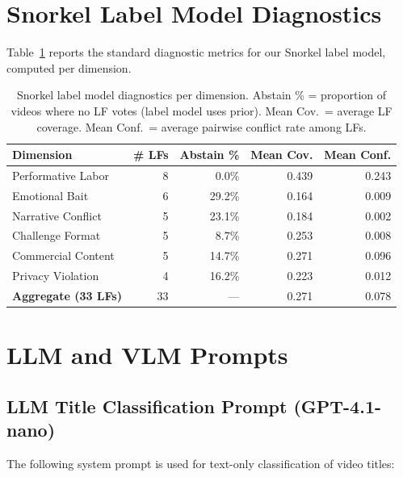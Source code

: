 \documentclass[letterpaper]{article} %
\begin{document}
\section{Snorkel Label Model Diagnostics}
\label{app:diagnostics}

Table~\ref{tab:diagnostics} reports the standard diagnostic metrics for our Snorkel label model, computed per dimension.

\begin{table}[h!]
\centering
\small
\begin{tabular}{lrrrr}
\toprule
\textbf{Dimension} & \textbf{\# LFs} & \textbf{Abstain \%} & \textbf{Mean Cov.} & \textbf{Mean Conf.} \\
\midrule
Performative Labor & 8 & 0.0\% & 0.439 & 0.243 \\
Emotional Bait & 6 & 29.2\% & 0.164 & 0.009 \\
Narrative Conflict & 5 & 23.1\% & 0.184 & 0.002 \\
Challenge Format & 5 & 8.7\% & 0.253 & 0.008 \\
Commercial Content & 5 & 14.7\% & 0.271 & 0.096 \\
Privacy Violation & 4 & 16.2\% & 0.223 & 0.012 \\
\midrule
\textbf{Aggregate (33 LFs)} & 33 & --- & 0.271 & 0.078 \\
\bottomrule
\end{tabular}
\caption{Snorkel label model diagnostics per dimension. Abstain \% = proportion of videos where no LF votes (label model uses prior). Mean Cov.\ = average LF coverage. Mean Conf.\ = average pairwise conflict rate among LFs.}
\label{tab:diagnostics}
\end{table}

\section{LLM and VLM Prompts}
\label{app:prompts}

\subsection{LLM Title Classification Prompt (GPT-4.1-nano)}

The following system prompt is used for text-only classification of video titles:
\end{document}
